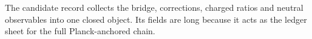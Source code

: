 \documentclass[11pt]{article}
\begin{document}
\begin{code}
\>[26]\AgdaSymbol{=}\AgdaSpace{}%
\<%
\\
%
\>[2]\AgdaSymbol{;}\AgdaSpace{}%
\AgdaSpace{}%
\AgdaSymbol{=}\AgdaSpace{}%
\<%
\\
%
\>[2]\AgdaSymbol{;}\AgdaSpace{}%
%
\>[26]\AgdaSymbol{=}\AgdaSpace{}%
\<%
\\
%
\>[2]\AgdaSymbol{;}\AgdaSpace{}%
%
\>[26]\AgdaSymbol{=}\AgdaSpace{}%
\<%
\\
%
\>[2]\AgdaSymbol{;}\AgdaSpace{}%
\AgdaSpace{}%
\AgdaSymbol{=}\AgdaSpace{}%
\<%
\\
%
\>[2]\AgdaSymbol{\}}\<%
\end{code}

The candidate record collects the bridge, corrections, charged ratios and
neutral observables into one closed object.  Its fields are long because it
acts as the ledger sheet for the full Planck-anchored chain.
\end{document}
